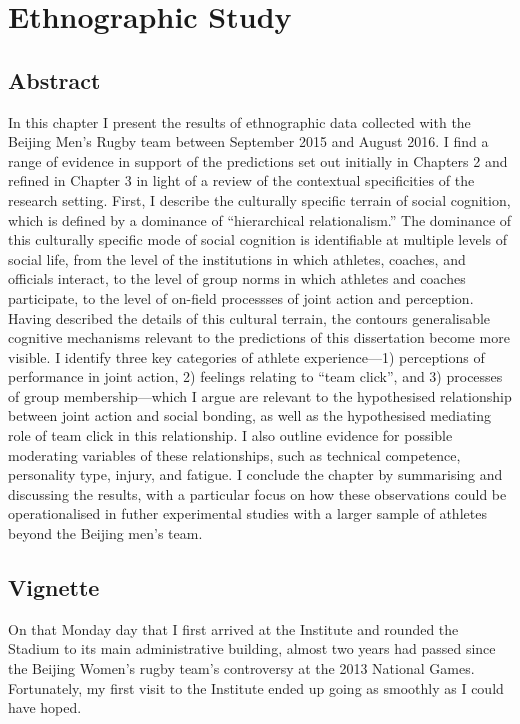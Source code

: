 


\chapter{\label{4ethnographicField}Ethnographic Study}

\minitoc
\section{Abstract}
In this chapter I present the results of ethnographic data collected with the Beijing Men's Rugby team between September 2015 and August 2016.  I find a range of evidence in support of the predictions set out initially in Chapters 2 and refined in Chapter 3 in light of a review of the contextual specificities of the research setting.  First, I describe the culturally specific terrain of social cognition, which is defined by a dominance of ``hierarchical relationalism.''  The dominance of this culturally specific mode of social cognition is identifiable at multiple levels of social life, from the level of the institutions in which athletes, coaches, and officials interact, to the level of group norms in which athletes and coaches participate, to the level of on-field processses of joint action and perception. Having described the details of this cultural terrain, the contours generalisable cognitive mechanisms relevant to the predictions of this dissertation become more visible. I identify three key categories of athlete experience---1) perceptions of performance in joint action, 2) feelings relating to ``team click'', and 3) processes of group membership---which I argue are relevant to the hypothesised relationship between joint action and social bonding, as well as the hypothesised mediating role of team click in this relationship. I also outline evidence for possible moderating variables of these relationships, such as technical competence, personality type, injury, and fatigue. I conclude the chapter by summarising and discussing the results, with a particular focus on how these observations could be operationalised in futher experimental studies with a larger sample of athletes beyond the Beijing men's team.



\section{Vignette}

On that Monday day that I first arrived at the Institute and rounded the Stadium to its main administrative building, almost two years had passed since the Beijing Women's rugby team's controversy at the 2013 National Games.  Fortunately, my first visit to the Institute ended up going as smoothly as I could have hoped.

